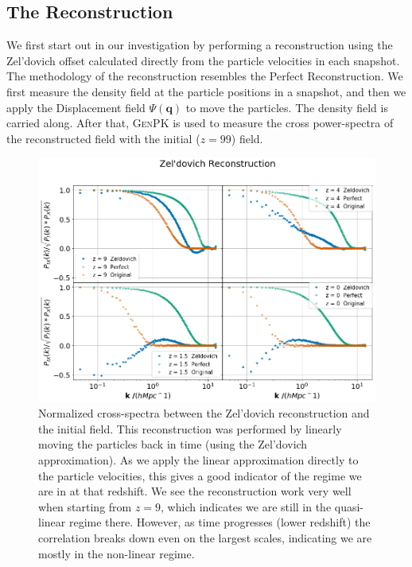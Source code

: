 \subsection{The Reconstruction}

We first start out in our investigation by performing a reconstruction using the Zel'dovich offset calculated directly from the particle velocities in each snapshot. The methodology of the reconstruction resembles the Perfect Reconstruction. We first measure the density field at the particle positions in a snapshot, and then we apply the Displacement field $\Psi(\textbf{q})$ to move the particles. The density field is carried along. After that, \textsc{GenPK} is used to measure the cross power-spectra of the reconstructed field with the initial ($z=99$) field.

\begin{figure}
    \centering
    \includegraphics[width=1\columnwidth]{images/realRecon/zeld.png}%
    
    \caption{
    Normalized cross-spectra between the Zel'dovich reconstruction and the initial field. This reconstruction was performed by linearly moving the particles back in time (using the Zel'dovich approximation). As we apply the linear approximation directly to the particle velocities, this gives a good indicator of the regime we are in at that redshift. We see the reconstruction work very well when starting from $z=9$, which indicates we are still in the quasi-linear regime there. However, as time progresses (lower redshift) the correlation breaks down even on the largest scales, indicating we are mostly in the non-linear regime. 
    }
    
    \label{fig:4.1}
\end{figure}

